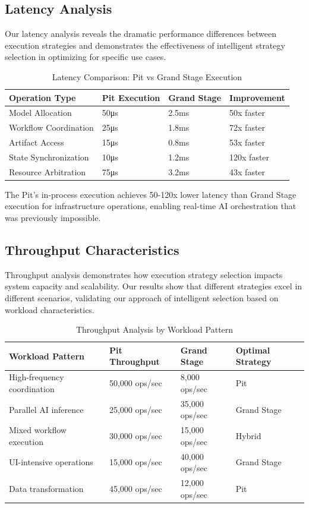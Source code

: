 \subsection*{Latency Analysis}

Our latency analysis reveals the dramatic performance differences between execution strategies and demonstrates the effectiveness of intelligent strategy selection in optimizing for specific use cases.

\begin{table}[ht]
\centering
\begin{tabular}{@{}llll@{}}
\toprule
\textbf{Operation Type} & \textbf{Pit Execution} & \textbf{Grand Stage} & \textbf{Improvement} \\
\midrule
Model Allocation & 50μs & 2.5ms & 50x faster \\
Workflow Coordination & 25μs & 1.8ms & 72x faster \\
Artifact Access & 15μs & 0.8ms & 53x faster \\
State Synchronization & 10μs & 1.2ms & 120x faster \\
Resource Arbitration & 75μs & 3.2ms & 43x faster \\
\bottomrule
\end{tabular}
\caption{Latency Comparison: Pit vs Grand Stage Execution}
\end{table}

\begin{alertbox}
The Pit's in-process execution achieves 50-120x lower latency than Grand Stage execution for infrastructure operations, enabling real-time AI orchestration that was previously impossible.
\end{alertbox}

\subsection*{Throughput Characteristics}

Throughput analysis demonstrates how execution strategy selection impacts system capacity and scalability. Our results show that different strategies excel in different scenarios, validating our approach of intelligent selection based on workload characteristics.

\begin{table}[ht]
\centering
\begin{tabular}{@{}llll@{}}
\toprule
\textbf{Workload Pattern} & \textbf{Pit Throughput} & \textbf{Grand Stage} & \textbf{Optimal Strategy} \\
\midrule
High-frequency coordination & 50,000 ops/sec & 8,000 ops/sec & Pit \\
Parallel AI inference & 25,000 ops/sec & 35,000 ops/sec & Grand Stage \\
Mixed workflow execution & 30,000 ops/sec & 15,000 ops/sec & Hybrid \\
UI-intensive operations & 15,000 ops/sec & 40,000 ops/sec & Grand Stage \\
Data transformation & 45,000 ops/sec & 12,000 ops/sec & Pit \\
\bottomrule
\end{tabular}
\caption{Throughput Analysis by Workload Pattern}
\end{table}

